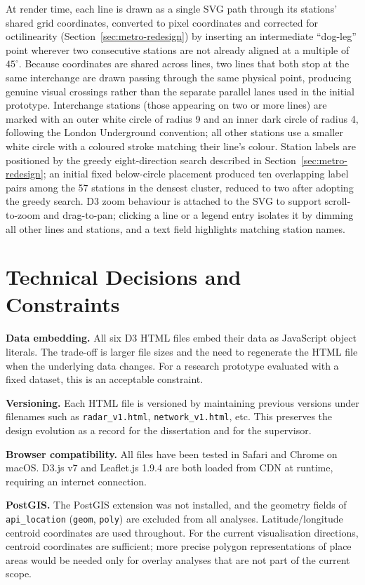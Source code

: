 \documentclass[logo,msc]{infthesis}
\begin{document}
At render time, each line is drawn as a single SVG path through its stations' shared grid coordinates, converted to pixel coordinates and corrected for octilinearity (Section~\ref{sec:metro-redesign}) by inserting an intermediate ``dog-leg'' point wherever two consecutive stations are not already aligned at a multiple of $45^\circ$. Because coordinates are shared across lines, two lines that both stop at the same interchange are drawn passing through the same physical point, producing genuine visual crossings rather than the separate parallel lanes used in the initial prototype. Interchange stations (those appearing on two or more lines) are marked with an outer white circle of radius 9 and an inner dark circle of radius 4, following the London Underground convention; all other stations use a smaller white circle with a coloured stroke matching their line's colour. Station labels are positioned by the greedy eight-direction search described in Section~\ref{sec:metro-redesign}; an initial fixed below-circle placement produced ten overlapping label pairs among the 57 stations in the densest cluster, reduced to two after adopting the greedy search. D3 zoom behaviour is attached to the SVG to support scroll-to-zoom and drag-to-pan; clicking a line or a legend entry isolates it by dimming all other lines and stations, and a text field highlights matching station names.
 
\section{Technical Decisions and Constraints}
\label{sec:technical-decisions}

\textbf{Data embedding.} All six D3 HTML files embed their data as JavaScript object literals. The trade-off is larger file sizes and the need to regenerate the HTML file when the underlying data changes. For a research prototype evaluated with a fixed dataset, this is an acceptable constraint.
 
\textbf{Versioning.} Each HTML file is versioned by maintaining previous versions under filenames such as \texttt{radar\_v1.html}, \texttt{network\_v1.html}, etc. This preserves the design evolution as a record for the dissertation and for the supervisor.
 
\textbf{Browser compatibility.} All files have been tested in Safari and Chrome on macOS. D3.js v7 and Leaflet.js 1.9.4 are both loaded from CDN at runtime, requiring an internet connection.
 
\textbf{PostGIS.} The PostGIS extension was not installed, and the geometry fields of \texttt{api\_location} (\texttt{geom}, \texttt{poly}) are excluded from all analyses. Latitude/longitude centroid coordinates are used throughout. For the current visualisation directions, centroid coordinates are sufficient; more precise polygon representations of place areas would be needed only for overlay analyses that are not part of the current scope.
\end{document}
